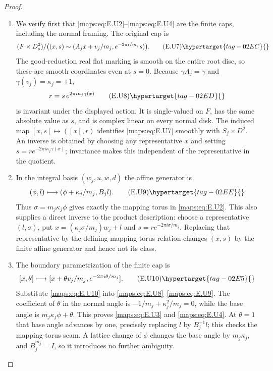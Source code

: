 \begin{proof}
\begin{enumerate}[label={$\langle1\rangle$\arabic*.},leftmargin=*]
\item We verify first that \eqref{maps:eq:E.U2}--\eqref{maps:eq:E.U4} are the finite caps,
including the normal framing.  The original cap is
\[
 (F\times D^2_s)/
 \bigl((x,s)\sim(A_jx+v_j/m_j,e^{-2\pi i/m_j}s)\bigr).
 \tag{E.U7}\hypertarget{tag-02EC}{}\label{maps:eq:E.U7}
\]
The good-reduction real flat marking is smooth on the entire
root disc, so these are smooth coordinates even at $s=0$.
Because $\gamma A_j=\gamma$ and $\gamma(v_j)=\kappa_j=\pm1$,
\[
                  r=s\,e^{2\pi i\kappa_j\gamma(x)}
 \tag{E.U8}\hypertarget{tag-02ED}{}\label{maps:eq:E.U8}
\]
is invariant under the displayed action.  It is single-valued
on $F$, has the same absolute value as $s$, and is complex
linear on every normal disk.  The induced map
$[x,s]\mapsto([x],r)$ identifies \eqref{maps:eq:E.U7} smoothly with
$S_j\times D^2$.  An inverse is obtained by choosing any
representative $x$ and setting
$s=r e^{-2\pi i\kappa_j\gamma(x)}$; invariance makes this
independent of the representative in the quotient.

\item In the integral basis $(w_j,u,w,d)$ the affine generator is
\[
                  (\phi,l)\longmapsto
                     (\phi+\kappa_j/m_j,B_jl).
 \tag{E.U9}\hypertarget{tag-02EE}{}\label{maps:eq:E.U9}
\]
Thus $\sigma=m_j\kappa_j\phi$ gives exactly the mapping torus
in \eqref{maps:eq:E.U2}.  This also supplies a direct inverse to the product
description: choose a representative $(l,\sigma)$, put
$x=(\kappa_j\sigma/m_j)w_j+l$ and
$s=r e^{-2\pi i\sigma/m_j}$.  Replacing that representative
by the defining mapping-torus relation changes $(x,s)$ by
the finite affine generator and hence not its class.

\item The boundary parametrization of the finite cap is
\[
 [x,\theta]\longmapsto
       [x+\theta v_j/m_j,e^{-2\pi i\theta/m_j}].
 \tag{E.U10}\hypertarget{tag-02E5}{}\label{maps:eq:E.U10}
\]
Substitute \eqref{maps:eq:E.U10} into \eqref{maps:eq:E.U8}--\eqref{maps:eq:E.U9}.  The coefficient of
$\theta$ in the normal angle is
$-1/m_j+\kappa_j^2/m_j=0$, while the base angle is
$m_j\kappa_j\phi+\theta$.  This proves \eqref{maps:eq:E.U3} and \eqref{maps:eq:E.U4}.
At $\theta=1$ that base angle advances by one, precisely
replacing $l$ by $B_j^{-1}l$; this checks the mapping-torus
seam.  A lattice change of $\phi$ changes the base angle by
$m_j\kappa_j$, and $B_j^{m_j}=I$, so it introduces no further
ambiguity.


\end{enumerate}
\end{proof}
